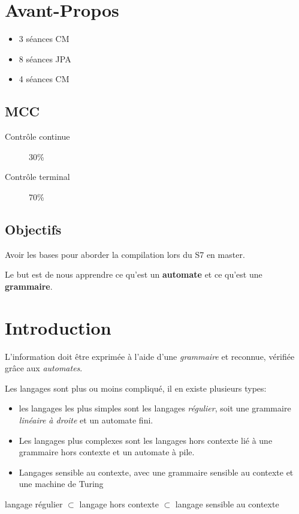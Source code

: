 \documentclass[12pt,a4paper,openany]{book}
\begin{document}
	\thispagestyle{empty} %
	\titleBC 
	\dominitoc
	\setcounter{tocdepth}{1}
	\setcounter{secnumdepth}{3}
	\setcounter{minitocdepth}{1}
	\chapter*{Avant-Propos}
	\begin{itemize}
		\item 3 séances CM
		\item 8 séances JPA
		\item 4 séances CM
	\end{itemize}
	\section*{MCC}
	\begin{description}
		\item[Contrôle continue] 30\%
		\item[Contrôle terminal] 70\%
	\end{description}
	\section*{Objectifs}
	Avoir les bases pour aborder la compilation lors du S7 en master.

	Le but est de nous apprendre ce qu'est un \textbf{automate} et ce qu'est une \textbf{grammaire}.
	\tableofcontents
	\chapter{Introduction}
	L'information doit être exprimée à l'aide d'une \textit{grammaire} et reconnue, vérifiée grâce aux \textit{automates}.

	Les langages sont plus ou moins compliqué, il en existe plusieurs types: 
	\begin{itemize}
		\item les langages les plus simples sont les langages \textit{régulier}, soit une grammaire \textit{linéaire à droite} et un
	automate fini.
		\item Les langages plus complexes sont les langages hors contexte lié à une grammaire hors contexte et un automate à pile.
		\item Langages sensible au contexte, avec une grammaire sensible au contexte et une machine de Turing
	\end{itemize}
	\begin{remarque}
		langage régulier $\subset$ langage hors contexte $\subset$ langage sensible au contexte 
	\end{remarque}
\end{document}
